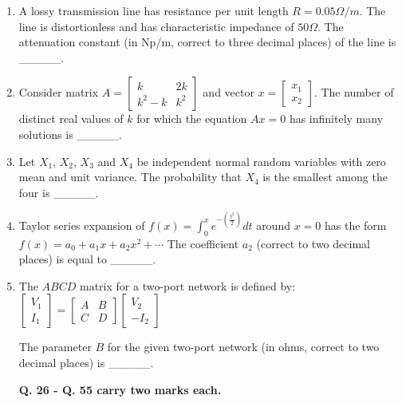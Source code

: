 \documentclass{article}
\begin{document}
\begin{enumerate}
\item A lossy transmission line has resistance per unit length $R = 0.05 \Omega/m$. The line is distortionless and has characteristic impedance of $50\Omega$. The attenuation constant (in Np/m, correct to three decimal places) of the line is \_\_\_\_\_.

\item Consider matrix $A = \begin{bmatrix} k & 2k \\ k^2 - k & k^2 \end{bmatrix}$ and vector $x = \begin{bmatrix} x_1 \\ x_2 \end{bmatrix}$. The number of distinct real values of $k$ for which the equation $Ax = 0$ has infinitely many solutions is \_\_\_\_\_.

\item Let $X_1$, $X_2$, $X_3$ and $X_4$ be independent normal random variables with zero mean and unit variance. The probability that $X_4$ is the smallest among the four is \_\_\_\_\_.

\item Taylor series expansion of $f(x) = \int_{0}^{x} e^{-\left(\frac{t^2}{2}\right)} dt$ around $x = 0$ has the form
$f(x) = a_0 + a_1 x + a_2 x^2 + \cdots$
The coefficient $a_2$ (correct to two decimal places) is equal to \_\_\_\_\_.

\item The $ABCD$ matrix for a two-port network is defined by:
$\begin{bmatrix} V_1 \\ I_1 \end{bmatrix} = \begin{bmatrix} A & B \\ C & D \end{bmatrix} \begin{bmatrix} V_2 \\ -I_2 \end{bmatrix}$
\begin{figure}[H]
    \centering
    
    \caption{}
    \label{fig:q35}
\end{figure}
The parameter $B$ for the given two-port network (in ohms, correct to two decimal places) is \_\_\_\_\_.

\textbf{Q. 26 - Q. 55 carry two marks each.}


\end{enumerate}
\end{document}
